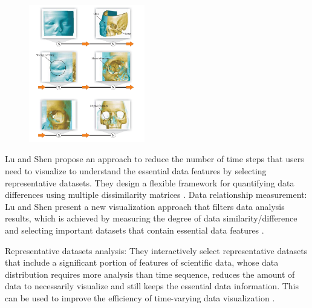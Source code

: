\documentclass{egpubl}
\begin{document}
\begin{figure}
\includegraphics[width=0.45\textwidth]{./images/wohlfart07storyTelling}
\label{fig:wohlfart07storyTelling}
\end{figure}

Lu and Shen propose an approach to reduce the number of time
steps that users need to visualize to understand the essential data features by selecting representative datasets. They design a flexible framework for quantifying data differences using multiple dissimilarity matrices \cite{lu2008interactive}.
Data relationship measurement: Lu and Shen \cite{lu2008interactive}  present a new visualization approach that filters data analysis results, which is achieved by measuring the degree of data similarity/difference and selecting important datasets that contain essential data features \cite{lu2008interactive}. 

Representative datasets analysis: They interactively select representative
datasets that include a significant portion of features of scientific data, whose data distribution requires more analysis than time
sequence, reduces the amount of data to necessarily visualize and still keeps the essential data information. This can be used to improve the efficiency of time-varying data visualization \cite{lu2008interactive}.
\end{document}
